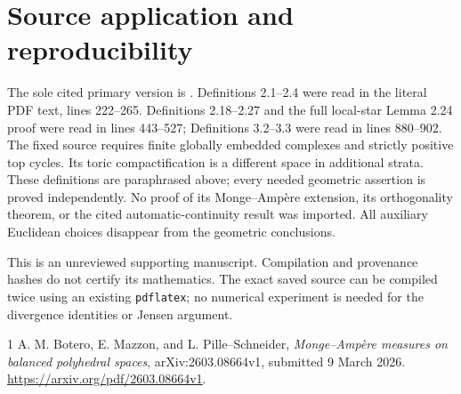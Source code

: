 \documentclass[11pt]{article}
\begin{document}
\section{Source application and reproducibility}
The sole cited primary version is \cite{BMPS}. Definitions 2.1--2.4 were read in the literal PDF text, lines 222--265. Definitions 2.18--2.27 and the full local-star Lemma 2.24 proof were read in lines 443--527; Definitions 3.2--3.3 were read in lines 880--902. The fixed source requires finite globally embedded complexes and strictly positive top cycles. Its toric compactification is a different space in additional strata. These definitions are paraphrased above; every needed geometric assertion is proved independently. No proof of its Monge--Amp\`ere extension, its orthogonality theorem, or the cited automatic-continuity result was imported. All auxiliary Euclidean choices disappear from the geometric conclusions.

This is an unreviewed supporting manuscript. Compilation and provenance hashes do not certify its mathematics. The exact saved source can be compiled twice using an existing \texttt{pdflatex}; no numerical experiment is needed for the divergence identities or Jensen argument.

\begin{thebibliography}{1}
 A. M. Botero, E. Mazzon, and L. Pille--Schneider,
\emph{Monge--Amp\`ere measures on balanced polyhedral spaces},
arXiv:2603.08664v1, submitted 9 March 2026.
\url{https://arxiv.org/pdf/2603.08664v1}.
\end{thebibliography}
\end{document}
